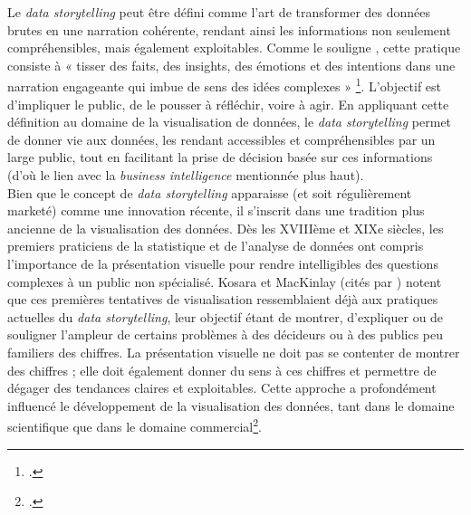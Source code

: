 Le \textit{data storytelling} peut être défini comme l’art de transformer des données brutes en une narration cohérente, rendant ainsi les informations non seulement compréhensibles, mais également exploitables. Comme le souligne \citeauthor{shao_data_2024}, cette pratique consiste à « tisser des faits, des insights, des émotions et des intentions dans une narration engageante qui imbue de sens des idées complexes » \footcite{shao_data_2024}. L’objectif est d’impliquer le public, de le pousser à réfléchir, voire à agir. En appliquant cette définition au domaine de la visualisation de données, le \textit{data storytelling} permet de donner vie aux données, les rendant accessibles et compréhensibles par un large public, tout en facilitant la prise de décision basée sur ces informations (d’où le lien avec la \textit{business intelligence} mentionnée plus haut).
\newline
{}\\

Bien que le concept de \textit{data storytelling} apparaisse (et soit régulièrement marketé) comme une innovation récente, il s’inscrit dans une tradition plus ancienne de la visualisation des données. Dès les XVIIIème et XIXe siècles, les premiers praticiens de la statistique et de l’analyse de données ont compris l’importance de la présentation visuelle pour rendre intelligibles des questions complexes à un public non spécialisé. Kosara et MacKinlay (cités par  \citeauthor{shao_data_2024}) notent que ces premières tentatives de visualisation ressemblaient déjà aux pratiques actuelles du \textit{data storytelling}, leur objectif étant de montrer, d’expliquer ou de souligner l’ampleur de certains problèmes à des décideurs ou à des publics peu familiers des chiffres. La présentation visuelle ne doit pas se contenter de montrer des chiffres ; elle doit également donner du sens à ces chiffres et permettre de dégager des tendances claires et exploitables. Cette approche a profondément influencé le développement de la visualisation des données, tant dans le domaine scientifique que dans le domaine commercial\footcite{shao_data_2024}.

